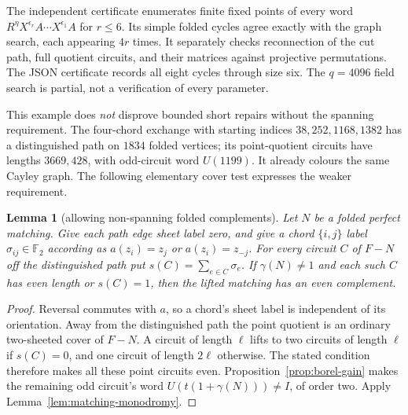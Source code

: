 \documentclass[11pt,a4paper]{article}
\newtheorem{lemma}[theorem]{Lemma}
\theoremstyle{definition}
\theoremstyle{remark}
\begin{document}
The independent certificate  enumerates finite fixed points of every word $R^\eta X^{\epsilon_r}A\cdots X^{\epsilon_1}A$ for $r\le6$.  Its simple folded cycles agree exactly with the graph search, each appearing $4r$ times.  It separately checks reconnection of the cut path, full quotient circuits, and their matrices against projective permutations.  The JSON certificate records all eight cycles through size six.  The $q=4096$ field search is partial, not a verification of every parameter.

This example does \emph{not} disprove bounded short repairs without the spanning requirement.  The four-chord exchange with starting indices $38,252,1168,1382$ has a distinguished path on $1834$ folded vertices; its point-quotient circuits have lengths $3669,428$, with odd-circuit word $U(1199)$.  It already colours the same Cayley graph.  The following elementary cover test expresses the weaker requirement.

\begin{lemma}[allowing non-spanning folded complements]\label{lem:borel-offroot}
Let $N$ be a folded perfect matching.  Give each path edge sheet label zero, and give a chord $\{i,j\}$ label $\sigma_{ij}\in\mathbb F_2$ according as $a(z_i)=z_j$ or $a(z_i)=z_{-j}$.  For every circuit $C$ of $F-N$ off the distinguished path put $s(C)=\sum_{e\in C}\sigma_e$.  If $\gamma(N)\ne1$ and each such $C$ has even length or $s(C)=1$, then the lifted matching has an even complement.
\end{lemma}
\begin{proof}
Reversal commutes with $a$, so a chord's sheet label is independent of its orientation.  Away from the distinguished path the point quotient is an ordinary two-sheeted cover of $F-N$.  A circuit of length $\ell$ lifts to two circuits of length $\ell$ if $s(C)=0$, and one circuit of length $2\ell$ otherwise.  The stated condition therefore makes all these point circuits even.  Proposition~\ref{prop:borel-gain} makes the remaining odd circuit's word $U(t(1+\gamma(N)))\ne I$, of order two.  Apply Lemma~\ref{lem:matching-monodromy}.
\end{proof}
\end{document}
